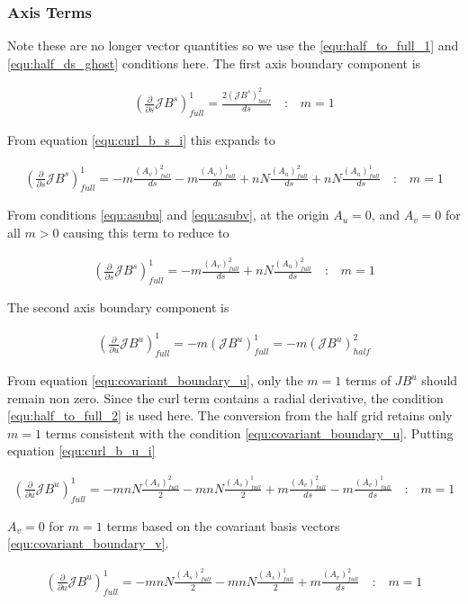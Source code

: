 \documentclass[11pt]{article}
\newcommand{\brackets}[1]{\left(#1\right)}
\newcommand{\equ}[2]{
	\begin{equation}
    \begin{split}
	#1
	\label{#2}
	\end{split}
	\end{equation}
}
\begin{document}
\subsubsection{Axis Terms}
\label{sub:sec:div_axis}
Note these are no longer vector quantities so we use the \ref{equ:half_to_full_1} and \ref{equ:half_ds_ghost} conditions here.
The first axis boundary component is
\equ{
\brackets{\frac{\partial}{\partial s}\mathcal{J}B^{s}}^{1}_{full}=\frac{2\brackets{\mathcal{J}B^{s}}^{2}_{half}}{ds}\quad\textrm{:}\quad m=1
}{equ:div_jb_s_ghost}
From equation \ref{equ:curl_b_s_i} this expands to
\equ{
\brackets{\frac{\partial}{\partial s}\mathcal{J}B^{s}}^{1}_{full}=-m\frac{\brackets{A_{v}}^{2}_{full}}{ds}-m\frac{\brackets{A_{v}}^{1}_{full}}{ds}+nN\frac{\brackets{A_{u}}^{2}_{full}}{ds}+nN\frac{\brackets{A_{u}}^{1}_{full}}{ds}\quad\textrm{:}\quad m=1
}{equ:div_jb_s_ghost_2}
From conditions \ref{equ:asubu} and \ref{equ:asubv}, at the origin $A_{u}=0$, and $A_v=0$ for all $m>0$ causing this term to reduce to
\equ{
\brackets{\frac{\partial}{\partial s}\mathcal{J}B^{s}}^{1}_{full}=-m\frac{\brackets{A_{v}}^{2}_{full}}{ds}+nN\frac{\brackets{A_{u}}^{2}_{full}}{ds}\quad\textrm{:}\quad m=1
}{equ:div_jb_s_ghost_3}

The second axis boundary component is
\equ{
\brackets{\frac{\partial}{\partial u}\mathcal{J}B^{u}}^{1}_{full}=-m\brackets{\mathcal{J}B^{u}}^{1}_{full}=-m\brackets{\mathcal{J}B^{u}}^{2}_{half}
}{equ:div_jb_u_ghost}
From equation \ref{equ:covariant_boundary_u}, only the $m=1$ terms of $JB^{u}$ should remain non zero.
Since the curl term contains a radial derivative, the condition \ref{equ:half_to_full_2} is used here.
The conversion from the half grid retains only $m=1$ terms consistent with the condition \ref{equ:covariant_boundary_u}.
Putting equation \ref{equ:curl_b_u_i}
\equ{
\brackets{\frac{\partial}{\partial u}\mathcal{J}B^{u}}^{1}_{full}=-mnN\frac{\brackets{A_{s}}^{2}_{full}}{2}-mnN\frac{\brackets{A_{s}}^{1}_{full}}{2}+m\frac{\brackets{A_{v}}^{2}_{full}}{ds}-m\frac{\brackets{A_{v}}^{1}_{full}}{ds}\quad\textrm{:}\quad m=1
}{equ:div_jb_u_ghost_2}
$A_{v}=0$ for $m=1$ terms based on the covariant basis vectors \ref{equ:covariant_boundary_v}.
\equ{
\brackets{\frac{\partial}{\partial u}\mathcal{J}B^{u}}^{1}_{full}=-mnN\frac{\brackets{A_{s}}^{2}_{full}}{2}-mnN\frac{\brackets{A_{s}}^{1}_{full}}{2}+m\frac{\brackets{A_{v}}^{2}_{full}}{ds}\quad\textrm{:}\quad m=1
}{equ:div_jb_u_ghost_3}
\end{document}
